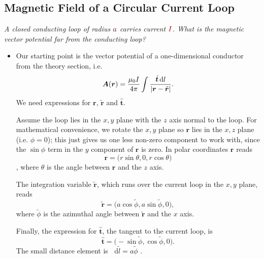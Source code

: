 \documentclass[11pt, a4paper]{article}
\newcommand{\diff}{\mathop{}\!\mathrm{d}} %
\newcommand{\dmath}[1]{\textcolor{Maroon}{#1}}  %
\renewcommand{\vec}[1]{\bm{#1}} %
\newcommand{\uvec}[1]{\hat{\vec{#1}}} %
\newcommand{\tvec}[1]{\tilde{\vec{#1}}} %
\renewcommand{\r}{\vec{r}}
\newcommand{\A}{\vec{A}}  %
\begin{document}
\subsection{Magnetic Field of a Circular Current Loop}
\textit{A closed conducting loop of radius $ \dmath{a} $ carries current $ \dmath{I} $. What is the magnetic vector potential far from the conducting loop?}
\begin{itemize}
	\item Our starting point is the vector potential of a one-dimensional conductor from the theory section, i.e.
	\begin{equation*}
		\A(\r) = \frac{\mu_{0}I}{4\pi} \int \frac{\uvec{t} \diff l}{\abs{\r - \tvec{r}}}.
	\end{equation*}
	We need expressions for $ \r $, $ \tvec{r} $ and $ \uvec{t} $.
	
	Assume the loop lies in the $ x, y $ plane with the $ z $ axis normal to the loop. For mathematical convenience, we rotate the $ x, y $ plane so $ \r $ lies in the $ x, z $ plane (i.e. $ \phi = 0 $); this just gives us one less non-zero component to work with, since the $ \sin \phi $ term in the $ y $ component of $ \r $ is zero. In polar coordinates $ \r $ reads
	\begin{equation*}
		\r = \big (r \sin \theta, 0, r \cos \theta \big )
	\end{equation*},
	where $ \theta $ is the angle between $ \r $ and the $ z $ axis. 
	
	The integration variable $ \tvec{r} $, which runs over the current loop in the $ x, y $ plane, reads
	\begin{equation*}
		\tvec{r} = \big(a \cos \tilde{\phi}, a \sin \tilde{\phi}, 0 \big),
	\end{equation*}
	where $ \tilde{\phi} $ is the azimuthal angle between $ \tvec{r} $ and the $ x $ axis. 
	
	Finally, the expression for $ \uvec{t} $, the tangent to the current loop, is
	\begin{equation*}
		\uvec{t} = \big( -\sin \tilde{\phi},  \cos \tilde{\phi}, 0\big).
	\end{equation*}
	The small distance element is $ \diff \tilde{l} = a \tilde{\phi}$ .
	

\end{itemize}
\end{document}
